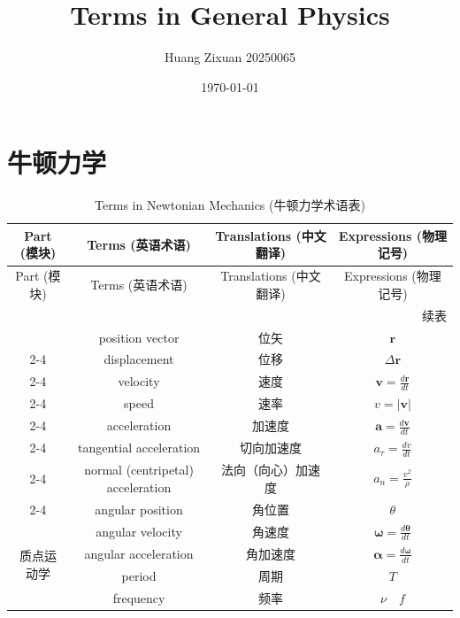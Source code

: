 \documentclass{article}
\title{\huge{Terms in General Physics}}
\author{Huang Zixuan 20250065}
\date{\today}
\begin{document}
  \maketitle

  \section{牛顿力学}
\begin{longtable}{|c|c|c|c|}
  \caption{Terms in Newtonian Mechanics (牛顿力学术语表)} \label{Tab.1} \\
  \hline
  Part (模块) & Terms (英语术语) & Translations (中文翻译) & Expressions (物理记号) \\ 
  \hline
  \endfirsthead

  \hline
  Part (模块) & Terms (英语术语) & Translations (中文翻译) & Expressions (物理记号) \\ 
  \hline
  \endhead

  \hline
  \multicolumn{4}{r}{续表} \\
  \endfoot

  \hline
  \endlastfoot

  \multirow{8}{*}{质点运动学}
  & position vector & 位矢 & $\boldsymbol{r}$ \\
  \cline{2-4}
  & displacement & 位移 & $\Delta\boldsymbol{r}$ \\
  \cline{2-4}
  & velocity & 速度 & $\boldsymbol{v}=\frac{d\boldsymbol{r}}{dt}$ \\
  \cline{2-4}
  & speed & 速率 & $v=|\boldsymbol{v}|$ \\
  \cline{2-4}
  & acceleration & 加速度 & $\boldsymbol{a}=\frac{d\boldsymbol{v}}{dt}$ \\
  \cline{2-4}
  & tangential acceleration & 切向加速度 & $a_{\tau}=\frac{dv}{dt}$ \\
  \cline{2-4}
  & normal (centripetal) acceleration & 法向（向心）加速度 & $a_n=\frac{v^2}{\rho}$ \\
  \cline{2-4}
  & angular position & 角位置 & $\theta$ \\
  \hline
  \multirow{4}{*}{质点运动学}
  & angular velocity & 角速度 & $\boldsymbol{\omega}=\frac{d\boldsymbol{\theta}}{dt}$ \\
  \cline{2-4}
  & angular acceleration & 角加速度 & $\boldsymbol{\alpha}=\frac{d\boldsymbol{\omega}}{dt}$ \\
  \cline{2-4}
  & period & 周期 & $T$ \\
  \cline{2-4}
  & frequency & 频率 & $\nu \quad f$ \\
  \hline


\end{longtable}
\end{document}
